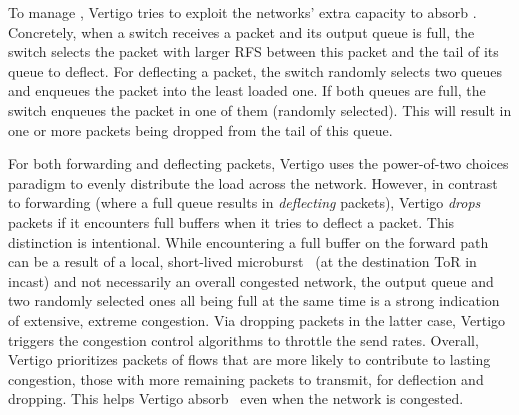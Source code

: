To manage \bursts, Vertigo tries to exploit the networks' extra capacity to absorb \bursts.
Concretely, when a switch receives a packet and its output queue is full, the switch selects the packet with larger RFS between this packet and the tail of its queue to deflect. For deflecting a packet, the switch randomly selects two queues and enqueues the packet into the least loaded one. If both queues are full, the switch enqueues the packet in one of them (randomly selected). This will result in one or more packets being dropped from the tail of this queue. 

For both forwarding and deflecting packets, Vertigo uses the 
power-of-two choices 
paradigm to evenly distribute the load across the network. However, in contrast to forwarding (where a full queue results in \emph{deflecting} packets), Vertigo \emph{drops} packets if it encounters full buffers when it tries to deflect a packet. This distinction is intentional.
While encountering a full buffer on the forward path can be a result of a local, short-lived microburst \ (\eg at the destination ToR in incast) and not necessarily an overall congested network, the output queue and two randomly selected ones all being full at the same time is a strong indication of extensive, extreme congestion. Via dropping packets in the latter case, Vertigo triggers the congestion control algorithms to throttle the send rates.
%
Overall, Vertigo prioritizes packets of flows that are more likely to contribute to lasting congestion, \ie those with more remaining packets to transmit, for deflection and dropping. This helps Vertigo absorb \bursts \ even when the network is congested.

%

